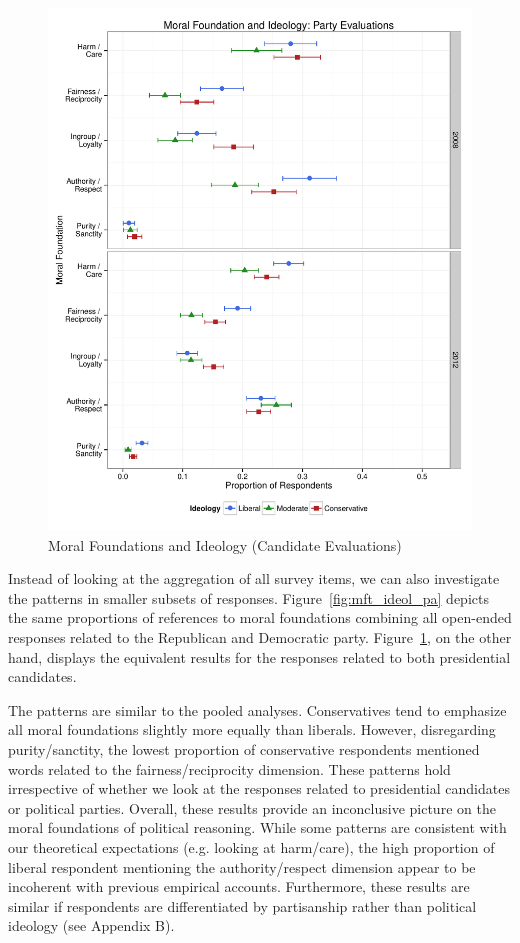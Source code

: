 \documentclass[12pt]{article}
\begin{document}
\begin{figure}\centering
\includegraphics[scale=.4]{../calc/fig/p3_mft_ideol_pa.pdf}
\caption{Moral Foundations and Ideology (Candidate Evaluations)}\label{fig:mft_ideol_ca}
\end{figure}

Instead of looking at the aggregation of all survey items, we can also investigate the patterns in smaller subsets of responses. Figure~\ref{fig:mft_ideol_pa} depicts the same proportions of references to moral foundations combining all open-ended responses related to the Republican and Democratic party. Figure~\ref{fig:mft_ideol_ca}, on the other hand, displays the equivalent results for the responses related to both presidential candidates.

The patterns are similar to the pooled analyses. Conservatives tend to emphasize all moral foundations slightly more equally than liberals. However, disregarding  purity/sanctity, the lowest proportion of conservative respondents mentioned words related to the fairness/reciprocity dimension. These patterns hold irrespective of whether we look at the responses related to presidential candidates or political parties. Overall, these results provide an inconclusive picture on the moral foundations of political reasoning. While some patterns are consistent with our theoretical expectations (e.g. looking at harm/care), the high proportion of liberal respondent mentioning the authority/respect dimension appear to be incoherent with previous empirical accounts. Furthermore, these results are similar if respondents are differentiated by partisanship rather than political ideology (see Appendix B).
\end{document}
